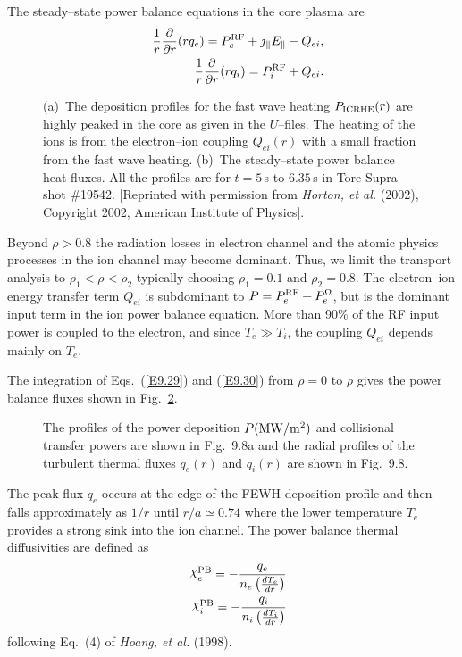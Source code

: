 \documentclass[a4paper,openany,12pt]{book}
\def\chix{\raise.5ex\hbox{$\chi$}}
\begin{document}
The steady--state power balance equations in the core plasma are
\begin{eqnarray}
&&\frac{1}{r}\frac{\partial}{\partial r}(rq_e)=P_e^{\rm RF}+j_\|E_\|-Q_{ei},\label{E9.29}\\
&&\frac{1}{r}\frac{\partial}{\partial r}(rq_i)=P_i^{\rm RF}+Q_{ei}.\label{E9.30}
\end{eqnarray}
%
\begin{figure}[H]
\centerline{}
\caption{(a)~The deposition profiles for the fast wave heating $P_{\rm ICRHE}(r)$ are highly peaked in the core as given in the $U$--files. The heating of
the ions is from the electron--ion coupling $Q_{ei}(r)$ with a small
fraction from the fast wave heating. (b)~The steady--state power balance
heat fluxes. All the profiles are for $t=5\,$s to $6.35\,$s in Tore
Supra shot \#19542. [Reprinted with permission from \emph{Horton, et al.} (2002), Copyright 2002, American Institute of Physics].}
\label{F9.7}
\end{figure}
%

Beyond $\rho>0.8$ the radiation losses in electron channel and the atomic physics processes in the ion channel may become dominant. Thus, we limit the transport analysis to $\rho_1<\rho<\rho_2$ typically choosing $\rho_1=0.1$ and $\rho_2=0.8$. The electron--ion energy transfer term $Q_{ei}$ is subdominant to $P=P_e^{\rm RF}+P_e^\Omega$, but is the dominant input term in the ion power balance equation. More than 90\% of the RF input power is coupled to the electron, and since $T_e\gg T_i$, the coupling $Q_{ei}$ depends mainly on $T_e$.

The integration of Eqs.~(\ref{E9.29}) and (\ref{E9.30}) from $\rho=0$ to $\rho$ gives the power balance fluxes shown in Fig.~\ref{F9.8}. 
%
\begin{figure}[H]
\centerline{}
\caption{The profiles of the power deposition $P(\rm MW/m^2)$ and collisional transfer powers are shown in Fig.~9.8a and the radial profiles of the turbulent thermal fluxes $q_e(r)$ and $q_i(r)$ are shown in Fig.~9.8.}
\label{F9.8}
\end{figure}
%
The peak flux $q_e$ occurs at the edge of the FEWH deposition profile and then falls approximately as $1/r$ until $r/a\simeq 0.74$ where the lower temperature $T_e$ provides a strong sink into the ion channel. The power balance thermal diffusivities are defined as
\begin{eqnarray}
&&\chix_e^{\rm PB}=-\frac{q_e}{n_e\left({dT_e\over dr}\right)}
\label{E9.31}\\
&&\chix_i^{\rm PB}=-\frac{q_i}{n_i\left({dT_i\over dr}\right)}
\label{E9.32}
\end{eqnarray}
following Eq.~(4) of \emph{Hoang, et al.} (1998).\\
\end{document}
